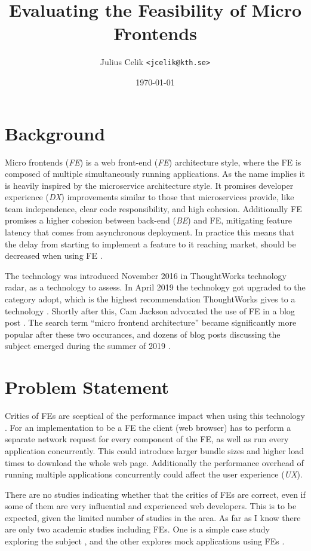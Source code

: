 \documentclass{article}
\title{Evaluating the Feasibility of Micro Frontends}
\author{Julius Celik \texttt{<jcelik@kth.se>}}
\date{\today}
\newcommand{\fe}{\textmugreek FE}
\begin{document}
\maketitle

\section{Background}
Micro frontends (\textit{\fe}) is a web front-end (\textit{FE}) architecture style, where the FE is composed of multiple simultaneously running applications. As the name implies it is heavily inspired by the microservice architecture style. It promises developer experience (\textit{DX}) improvements similar to those that microservices provide, like team independence, clear code responsibility, and high cohesion. Additionally \fe{} promises a higher cohesion between back-end (\textit{BE}) and FE, mitigating feature latency that comes from asynchronous deployment. In practice this means that the delay from starting to implement a feature to it reaching market, should be decreased when using \fe{} \cite{Celik}.

The technology was introduced November 2016 in ThoughtWorks technology radar, as a technology to assess. In April 2019 the technology got upgraded to the category adopt, which is the highest recommendation ThoughtWorks gives to a technology \cite{ThoughtWorks}. Shortly after this, Cam Jackson \citeauthor{Jackson2019} advocated the use of \fe{} in a blog post \cite{Jackson2019}. The search term ``micro frontend architecture'' became significantly more popular after these two occurances, and dozens of blog posts discussing the subject emerged during the summer of 2019 \cite{Google}.

\section{Problem Statement}
Critics of \fe{}s are sceptical of the performance impact when using this technology \cite{Larkin@TheLarkInn2019,Evakallio@jevakallio2019}. For an implementation to be a \fe{} the client (web browser) has to perform a separate network request for every component of the FE, as well as run every application concurrently. This could introduce larger bundle sizes and higher load times to download the whole web page. Additionally the performance overhead of running multiple applications concurrently could affect the user experience (\textit{UX}).

There are no studies indicating whether that the critics of \fe{}s are correct, even if some of them are very influential and experienced web developers. This is to be expected, given the limited number of studies in the area. As far as I know there are only two academic studies including \fe{}s. One is a simple case study exploring the subject \cite{Yang2019}, and the other explores mock applications using \fe{}s \cite{baumann2019micro}.
\end{document}
